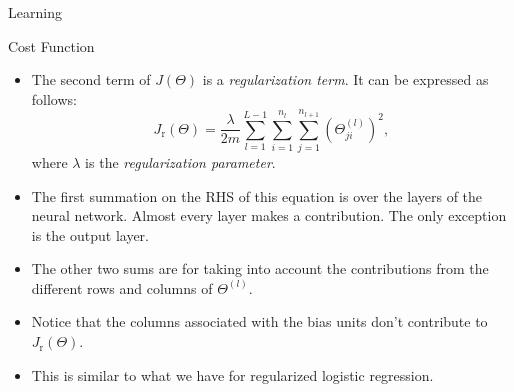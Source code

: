 \documentclass[8pt,american]{beamer}
\begin{document}
\begin{frame}{Learning}

\begin{block}{Cost Function}
\begin{itemize}
\justifying
\item The second term of $J\left(\Theta\right)$ is a \textit{regularization
  term}. It can be expressed as follows:
  \begin{equation}
  J_{\mathrm{r}}\left(\Theta\right)=\frac{\lambda}{2m}\sum_{l=1}^{L-1}\sum_{i=1}^{n_{l}}\sum_{j=1}^{n_{l+1}}\left(\Theta_{ji}^{\left(l\right)}\right)^{2},
  \end{equation}
  where $\lambda$ is the \textit{regularization parameter}.
\item The first summation on the RHS of this equation is over the layers of the
  neural network. Almost every layer makes a contribution. The only exception
  is the output layer.
\item The other two sums are for taking into account the contributions from the
  different rows and columns of $\Theta^{\left(l\right)}$.
\item Notice that the columns associated with the bias units don't contribute
  to $J_{\mathrm{r}}\left(\Theta\right)$.
\item This is similar to what we have for regularized logistic regression.
\end{itemize}
\end{block}

\end{frame}
\end{document}
